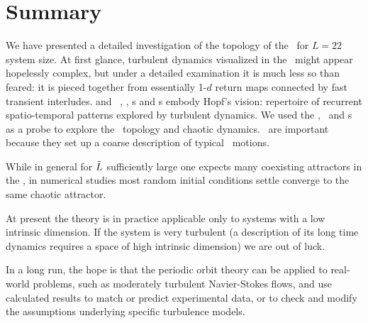 
\section{Summary}
\label{sect:rpo-sum}


We have presented a detailed investigation
of the topology of the
{\KS} \statesp\ for $L=22$ system size.
At first glance, turbulent dynamics visualized in the \statesp\ might appear
hopelessly complex, but under a detailed examination it is
much less so than feared: it is
pieced together from essentially {1-$d$ return maps}
connected by fast transient interludes.
{\KS} and \PCf\  \eqv, \reqv, \po s and 
\rpo s embody Hopf's vision:
repertoire of recurrent spatio-temporal
patterns explored by turbulent dynamics.
We used
the \eqva, \reqva\ and {\rpo}s as a probe to explore the
\statesp\  topology and chaotic dynamics.
\Eqva\ are important because they set up 
a coarse description of 
typical \statesp\ motions.

While in general
for $\tilde{L}$ sufficiently large
one expects many 
coexisting attractors in the \statesp%
,
in numerical studies most random initial
conditions settle converge to the same chaotic attractor. 

At present the theory is in practice applicable only to systems
with a low intrinsic dimension.
If the system is very turbulent
(a description of its long time dynamics requires a space of high
intrinsic dimension) we are out of luck. 

In a long run, the hope is that the periodic orbit theory
can be applied to real-world
problems, such as moderately turbulent Navier-Stokes
flows, and use calculated results to match or predict
experimental data, or to check and modify the assumptions underlying specific
turbulence models.



